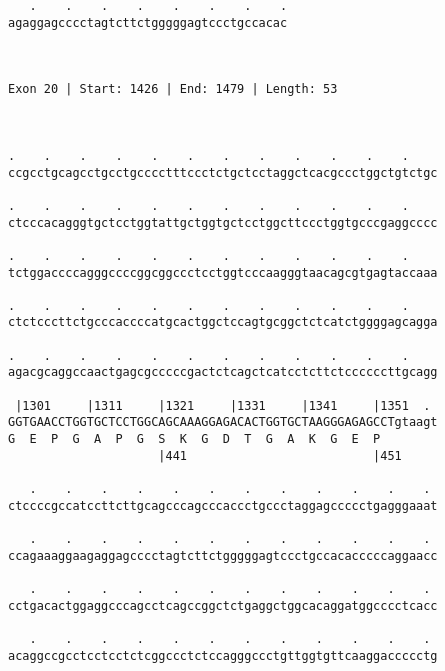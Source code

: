 \documentclass{article}
\begin{document}
\begin{Verbatim}
   .    .    .    .    .    .    .    .
agaggagcccctagtcttctgggggagtccctgccacac
                                       
                                       
 
Exon 20 | Start: 1426 | End: 1479 | Length: 53



.    .    .    .    .    .    .    .    .    .    .    .    
ccgcctgcagcctgcctgcccctttccctctgctcctaggctcacgccctggctgtctgc
                                                            
.    .    .    .    .    .    .    .    .    .    .    .    
ctcccacagggtgctcctggtattgctggtgctcctggcttccctggtgcccgaggcccc
                                                            
.    .    .    .    .    .    .    .    .    .    .    .    
tctggaccccagggccccggcggccctcctggtcccaagggtaacagcgtgagtaccaaa
                                                            
.    .    .    .    .    .    .    .    .    .    .    .    
ctctcccttctgcccaccccatgcactggctccagtgcggctctcatctggggagcagga
                                                            
.    .    .    .    .    .    .    .    .    .    .    .    
agacgcaggccaactgagcgcccccgactctcagctcatcctcttctccccccttgcagg
                                                            
 |1301     |1311     |1321     |1331     |1341     |1351  . 
GGTGAACCTGGTGCTCCTGGCAGCAAAGGAGACACTGGTGCTAAGGGAGAGCCTgtaagt
G  E  P  G  A  P  G  S  K  G  D  T  G  A  K  G  E  P        
                     |441                          |451     
  
   .    .    .    .    .    .    .    .    .    .    .    . 
ctccccgccatccttcttgcagcccagcccaccctgccctaggagccccctgagggaaat
                                                            
   .    .    .    .    .    .    .    .    .    .    .    . 
ccagaaaggaagaggagcccctagtcttctgggggagtccctgccacacccccaggaacc
                                                            
   .    .    .    .    .    .    .    .    .    .    .    . 
cctgacactggaggcccagcctcagccggctctgaggctggcacaggatggcccctcacc
                                                            
   .    .    .    .    .    .    .    .    .    .    .    . 
acaggccgcctcctcctctcggccctctccagggccctgttggtgttcaaggaccccctg
                                                            

\end{Verbatim}
\end{document}
